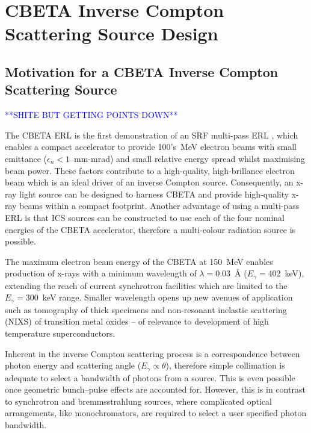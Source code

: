 \documentclass[../main.tex]{subfiles}
\begin{document}
\chapter{CBETA Inverse Compton Scattering Source Design}
\label{CBETA_Inverse_Compton_Scattering_Source_Design} %

\section{Motivation for a CBETA Inverse Compton Scattering Source}

\textcolor{blue}{**SHITE BUT GETTING POINTS DOWN**}

The CBETA ERL is the first demonstration of an SRF multi-pass ERL \cite{bartnik2020cbeta}, which enables a compact accelerator to provide 100's~\si{\mega\electronvolt} electron beams with small emittance ($\epsilon_{n} < 1$~\si{\milli\meter}-\si{\milli\radian}) and small relative energy spread whilst maximising beam power. These factors contribute to a high-quality, high-brillance electron beam which is an ideal driver of an inverse Compton source. Consequently, an x-ray light source can be designed to harness CBETA and provide high-quality x-ray beams within a compact footprint. Another advantage of using a multi-pass ERL is that ICS sources can be constructed to use each of the four nominal energies of the CBETA accelerator, therefore a multi-colour radiation source is possible. 

 The maximum electron beam energy of the CBETA at 150~\si{\mega\electronvolt} enables production of x-rays with a minimum wavelength of $\lambda = 0.03$~\si{\angstrom} ($E_{\gamma} = 402$~\si{\kilo\electronvolt}), extending the reach of current synchrotron facilities which are limited to the $E_{\gamma} = 300$~\si{\kilo\electronvolt} range. Smaller wavelength opens up new avenues of application such as tomography of thick specimens and non-resonant inelastic scattering (NIXS) of transition metal oxides -- of relevance to development of high temperature superconductors.
 
 Inherent in the inverse Compton scattering process is a correspondence between photon energy and scattering angle ($E_{\gamma} \propto \theta$), therefore simple collimation is adequate to select a bandwidth of photons from a source. This is even possible once geometric bunch--pulse effects are accounted for. However, this is in contrast to synchrotron and bremmsstrahlung sources, where complicated optical arrangements, like monochromators, are required to select a user specified photon bandwidth. 
 
\end{document}
